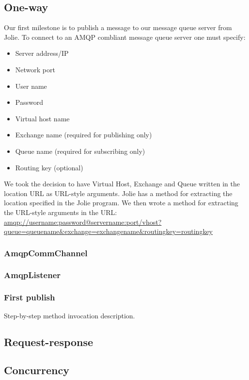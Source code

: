 \subsection{One-way}
Our first milestone is to publish a message to our message queue server from Jolie. To connect to an AMQP combliant message queue server one must specify:
\begin{itemize}
\item Server address/IP
\item Network port
\item User name
\item Password
\item Virtual host name
\item Exchange name (required for publishing only)
\item Queue name (required for subscribing only)
\item Routing key (optional)
\end{itemize}
We took the decision to have Virtual Host, Exchange and Queue written in the location URL as URL-style arguments. Jolie has a method for extracting the location specified in the Jolie program. We then wrote a method for extracting the URL-style arguments in the URL:\\
\url{amqp://username:password@servername:port/vhost?queue=queuename&exchange=exchangename&routingkey=routingkey}
\subsubsection{AmqpCommChannel}
\subsubsection{AmqpListener}
\subsubsection{First publish}
Step-by-step method invocation description.
\subsection{Request-response}
\subsection{Concurrency}
\newpage